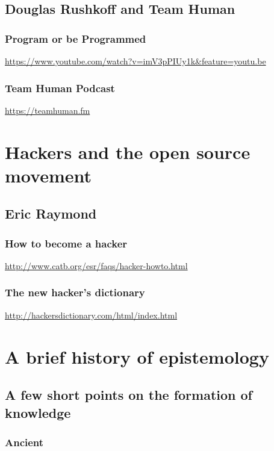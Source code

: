 \documentclass[11pt]{article}
\begin{document}
\subsection*{Douglas Rushkoff and Team Human}
\label{sec:orge1c65ca}
\subsubsection*{Program or be Programmed}
\label{sec:orge33bb4b}
\url{https://www.youtube.com/watch?v=imV3pPIUy1k\&feature=youtu.be}

\subsubsection*{Team Human Podcast}
\label{sec:org2d94508}
\url{https://teamhuman.fm}



\section*{Hackers and the open source movement}
\label{sec:orgb9a7710}
\subsection*{Eric Raymond}
\label{sec:orgc4f540a}
\subsubsection*{How to become a hacker}
\label{sec:org667810b}
\url{http://www.catb.org/esr/faqs/hacker-howto.html}
\subsubsection*{The new hacker's dictionary}
\label{sec:org1e63be4}
\url{http://hackersdictionary.com/html/index.html}


\section*{A brief history of epistemology}
\label{sec:org7a23a60}
\subsection*{A few short points on the formation of knowledge}
\label{sec:orge79b3a7}
\subsubsection*{Ancient}
\label{sec:org4749bc0}
\end{document}
